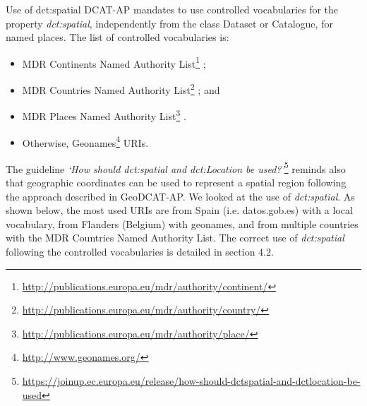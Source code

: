 \documentclass[<options>]{elsarticle}
\begin{document}
Use of dct:spatial
DCAT-AP mandates to use controlled vocabularies for the property \textit{dct:spatial}, independently from the class Dataset or Catalogue, for named places. The list of controlled vocabularies is:

\begin{itemize}
\item MDR Continents Named Authority List\footnote{\href{  http://publications.europa.eu/mdr/authority/continent/}{  http://publications.europa.eu/mdr/authority/continent/}} ;
\item MDR Countries Named Authority List\footnote{\href{  http://publications.europa.eu/mdr/authority/country/}{  http://publications.europa.eu/mdr/authority/country/}} ; and
\item MDR Places Named Authority List\footnote{\href{  http://publications.europa.eu/mdr/authority/place/}{  http://publications.europa.eu/mdr/authority/place/}} .
\item Otherwise, Geonames\footnote{\href{  http://www.geonames.org/}{  http://www.geonames.org/}} URIs.
\end{itemize}

The guideline \textit{‘How should dct:spatial and dct:Location be used?’}\footnote{\href{  https://joinup.ec.europa.eu/release/how-should-dctspatial-and-dctlocation-be-used}{  https://joinup.ec.europa.eu/release/how-should-dctspatial-and-dctlocation-be-used}} reminds also that geographic coordinates can be used to represent a spatial region following the approach described in GeoDCAT-AP. We looked at the use of \textit{dct:spatial}. As shown below, the most used URIs are from Spain (i.e. datos.gob.es) with a local vocabulary, from Flanders (Belgium) with geonames, and from multiple countries with the MDR Countries Named Authority List. The correct use of \textit{dct:spatial} following the controlled vocabularies is detailed in section 4.2. 
\end{document}

